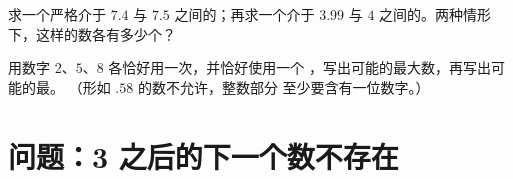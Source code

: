 \begin{exercise}[$\star\star$]\label{exo:g6:decimals:11}
求一个严格介于 $7.4$ 与 $7.5$ 之间的；再求一个介于
$3.99$ 与 $4$ 之间的。两种情形下，这样的数各有多少个？
\end{exercise}

\begin{exercise}[$\star\star\star$]\label{exo:g6:decimals:12}
用数字 $2$、$5$、$8$ 各恰好用一次，并恰好使用一个
，写出可能的最大数，再写出可能的最。
（形如 $.58$ 的数不允许，整数部分
至少要含有一位数字。）
\end{exercise}

\section{问题：3 之后的下一个数不存在}

